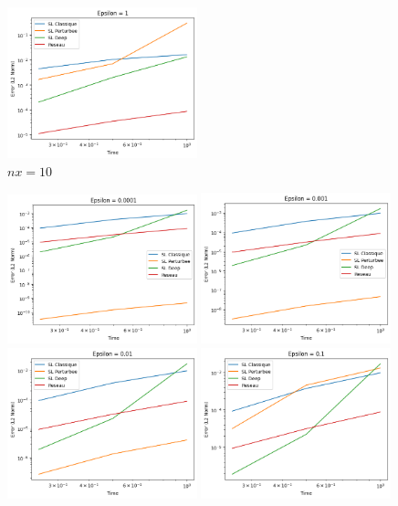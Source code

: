 \documentclass{article}
\begin{document}
\begin{figure}[!h]
    \includegraphics[width=0.49\textwidth]{images/10ep25.png}
    \caption{$nx = 10$}
\end{figure}

\begin{figure}[htbp]
    \centering
    \includegraphics[width=0.49\textwidth]{images/20ep21.png}
    \includegraphics[width=0.49\textwidth]{images/20ep22.png}
    \includegraphics[width=0.49\textwidth]{images/20ep23.png}
    \includegraphics[width=0.49\textwidth]{images/20ep24.png}

\end{figure}
\end{document}
